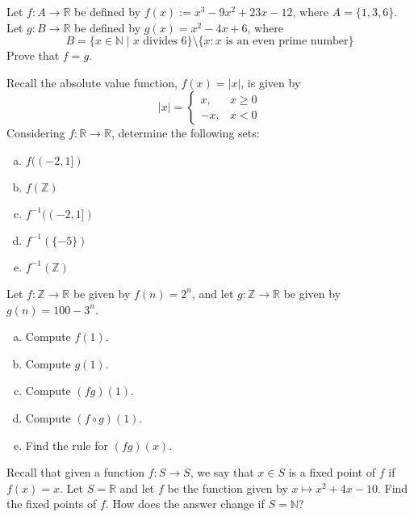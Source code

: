 \documentclass[11pt,letterpaper]{article}
\begin{document}
\homework{}

 Let $f: A \to \mathbb{R}$ be defined by $f(x):= x^3 - 9x^2 + 23x - 12$, where $A= \{ 1, 3, 6 \}$. Let $g: B \to \mathbb{R}$ be defined by $g(x)= x^2 - 4x + 6$, where 
	\[
	B= \{ x \in \mathbb{N} \;|\; x \text{ divides }6 \} \setminus \{x \colon x \text{ is an even prime number} \}
	\]
Prove that $f= g$. 





\newpage





 Recall the absolute value function, $f(x)= |x|$, is given by
	\[
	|x|= 
	\begin{cases}
	x, & x \geq 0 \\
	-x, & x < 0 
	\end{cases}
	\]
Considering $f: \mathbb{R} \to \mathbb{R}$, determine the following sets:
\begin{enumerate}[(a)]
\item $f((-2, 1])$
\item $f(\mathbb{Z})$
\item $f^{-1}((-2,1])$
\item $f^{-1}(\{-5\})$
\item $f^{-1}(\mathbb{Z})$
\end{enumerate}





\newpage





 Let $f: \mathbb{Z} \to \mathbb{R}$ be given by $f(n)= 2^n$, and let $g: \mathbb{Z} \to \mathbb{R}$ be given by $g(n)= 100 - 3^n$. 
\begin{enumerate}[(a)]
\item Compute $f(1)$.
\item Compute $g(1)$.
\item Compute $(fg)(1)$.
\item Compute $(f \circ g)(1)$.
\item Find the rule for $(fg)(x)$.
\end{enumerate}





\newpage





 Recall that given a function $f: S \to S$, we say that $x \in S$ is a fixed point of $f$ if $f(x)= x$. Let $S= \mathbb{R}$ and let $f$ be the function given by $x \mapsto x^2 + 4x - 10$. Find the fixed points of $f$. How does the answer change if $S= \mathbb{N}$? 
\end{document}
